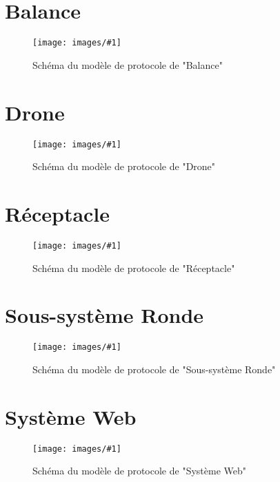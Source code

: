 

\newcommand{\InputPM}[2]{
    \section{#2}

    \begin{figure}[H]
        \centering
        \texttt{[image: images/\#1]}
        \caption{Schéma du modèle de protocole de "#2"}
    \end{figure}
}




\InputPM{balance}{Balance}
\InputPM{drone}{Drone}
\InputPM{receptacle}{Réceptacle}
\InputPM{ronde}{Sous-système Ronde}
\InputPM{web}{Système Web}


